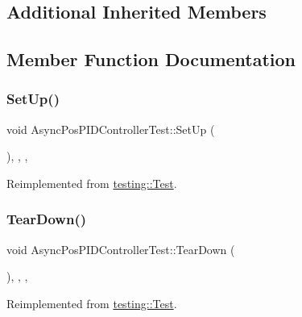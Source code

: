 \subsection*{Additional Inherited Members}


\subsection{Member Function Documentation}
\mbox{\label{classAsyncPosPIDControllerTest_ace99fff2e9eeccbdefa54d6103e968ae}} 
\subsubsection{\texorpdfstring{SetUp()}{SetUp()}}
{\footnotesize\ttfamily void Async\+Pos\+P\+I\+D\+Controller\+Test\+::\+Set\+Up (\begin{DoxyParamCaption}{ }\end{DoxyParamCaption})\hspace{0.3cm}{\ttfamily [inline]}, {\ttfamily [override]}, {\ttfamily [protected]}, {\ttfamily [virtual]}}



Reimplemented from \mbox{\hyperlink{classtesting_1_1Test_a190315150c303ddf801313fd1a777733}{testing\+::\+Test}}.

\mbox{\label{classAsyncPosPIDControllerTest_ad5937276fbd677ef831580a5d41b2d3e}} 
\subsubsection{\texorpdfstring{TearDown()}{TearDown()}}
{\footnotesize\ttfamily void Async\+Pos\+P\+I\+D\+Controller\+Test\+::\+Tear\+Down (\begin{DoxyParamCaption}{ }\end{DoxyParamCaption})\hspace{0.3cm}{\ttfamily [inline]}, {\ttfamily [override]}, {\ttfamily [protected]}, {\ttfamily [virtual]}}



Reimplemented from \mbox{\hyperlink{classtesting_1_1Test_a5f0ab439802cbe0ef7552f1a9f791923}{testing\+::\+Test}}.



